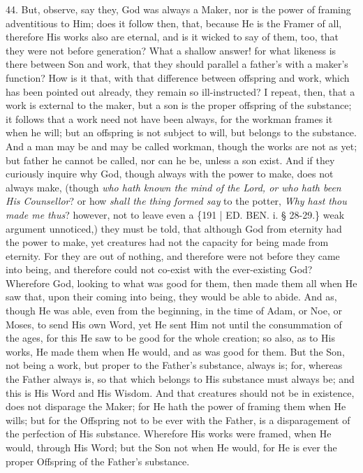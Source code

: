 44. But, observe, say they,
God was always a Maker, nor is the power of framing adventitious to
Him; does it follow then, that, because He is the Framer of all,
therefore His works also are eternal, and is it wicked to say of them,
too, that they were not before generation? What a shallow answer! for
what likeness is there between Son and work, that they should parallel
a father's with a maker's function? How is it that, with that
difference between offspring and work, which has been pointed out
already, they remain so ill-instructed? I repeat, then, that a work is
external to the maker, but a son is the proper offspring of the
substance; it follows that a work need not have been always, for the
workman frames it when he will; but an offspring is not subject to
will, but belongs to the substance. And a man may be and may be called
workman, though the works are not as yet; but father he cannot be
called, nor can he be, unless a son exist. And if they curiously
inquire why God, though always with the power to make, does not always
make, (though \emph{who hath known the mind of the Lord, or who hath been
His Counsellor}? or how \emph{shall the thing formed say} to the
potter, \emph{Why hast thou made me thus}? however, not to leave even
a \{191 | ED.
BEN.
i. § 28-29.\} weak argument unnoticed,) they must be told, that
although God from eternity had the power to make, yet creatures had
not the capacity for being made from eternity. For they are out of
nothing, and therefore were not before they came into being, and
therefore could not co-exist with the ever-existing God? Wherefore
God, looking to what was good for them, then made them all when He saw
that, upon their coming into being, they would be able to abide. And
as, though He was able, even from the beginning, in the time of Adam,
or Noe, or Moses, to send His own Word, yet He sent Him not until the
consummation of the ages, for this He saw to be good for the whole
creation; so also, as to His works, He made them when He would, and as
was good for them. But the Son, not being a work, but proper to the
Father's substance, always is; for, whereas the Father always is, so
that which belongs to His substance must always be; and this is His
Word and His Wisdom. And that creatures should not be in existence,
does not disparage the Maker; for He hath the power of framing them
when He wills; but for the Offspring not to be ever with the Father,
is a disparagement of the perfection of His substance. Wherefore His
works were framed, when He would, through His Word; but the Son not
when He would, for He is ever the proper Offspring of the Father's
substance.

